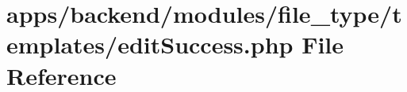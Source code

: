 \hypertarget{backend_2modules_2file__type_2templates_2edit_success_8php}{\section{apps/backend/modules/file\-\_\-type/templates/edit\-Success.php File Reference}
\label{backend_2modules_2file__type_2templates_2edit_success_8php}
}
